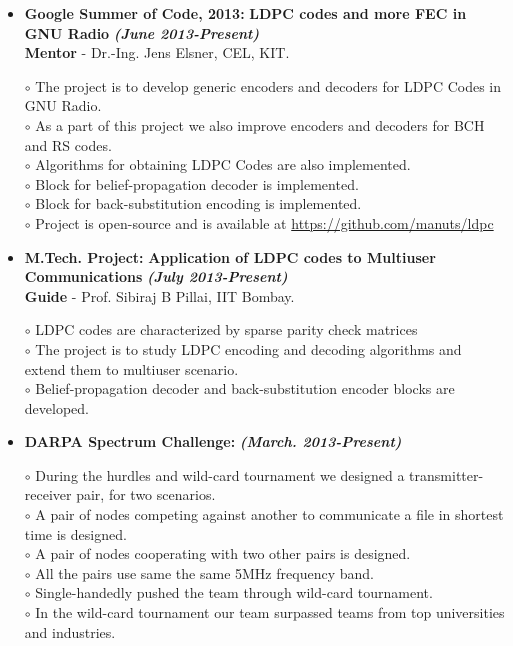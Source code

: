 \documentclass[a4paper,10pt]{article}
\begin{document}
 \begin{itemize}
 \setlength{\itemsep}{1pt}
 \item \textbf{Google Summer of Code, 2013:} \textbf{LDPC codes and more FEC in GNU Radio}  \textbf \emph{(June 2013-Present)}\\
        {\textbf{Mentor} - Dr.-Ing. Jens Elsner, CEL, KIT.   }          %

        $\circ$ The project is to develop generic encoders and decoders for LDPC Codes in GNU Radio. \\
        $\circ$ As a part of this project we also improve encoders and decoders for BCH and RS codes. \\
        $\circ$ Algorithms for obtaining LDPC Codes are also implemented. \\
        $\circ$ Block for belief-propagation decoder is implemented. \\
        $\circ$ Block for back-substitution encoding is implemented. \\
        $\circ$ Project is open-source and is available at \url{https://github.com/manuts/ldpc}

        \item \textbf{M.Tech. Project:} \textbf{Application of LDPC codes to Multiuser Communications} \textbf \emph{(July 2013-Present)} \\
        {\textbf{Guide} - Prof. Sibiraj B Pillai, IIT Bombay.}            %
        
$\circ$ LDPC codes are characterized by sparse parity check matrices \\ 
$\circ$ The project is to study LDPC encoding and decoding algorithms and extend them to multiuser scenario. \\
$\circ$ Belief-propagation decoder and back-substitution encoder blocks are developed.

        
\item \textbf{DARPA Spectrum Challenge:} \textbf \emph{(March. 2013-Present)}

$\circ$ During the hurdles and wild-card tournament we designed a transmitter-receiver pair, for two scenarios. \\
$\circ$ A pair of nodes competing against another to communicate a file in shortest time is designed. \\
$\circ$ A pair of nodes cooperating with two other pairs is designed. \\
$\circ$ All the pairs use same the same 5MHz frequency band. \\
$\circ$ Single-handedly pushed the team through wild-card tournament. \\
$\circ$ In the wild-card tournament our team surpassed teams from top universities and industries.


\end{itemize}
\end{document}
